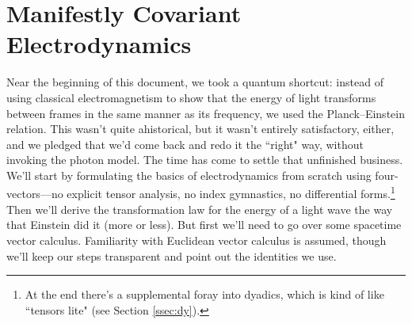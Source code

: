 \documentclass[12pt]{article}
\renewcommand{\vv}[1]{\mathbf{#1}}
\begin{document}



\clearpage

\section{Manifestly Covariant Electrodynamics}\label{sec:rem}

Near the beginning of this document, we took a quantum shortcut: instead of using classical electromagnetism to show that the energy of light transforms between frames in the same manner as its frequency, we used the Planck--Einstein relation. This wasn't quite ahistorical, but it wasn't entirely satisfactory, either, and we pledged that we'd come back and redo it the ``right" way, without invoking the photon model. The time has come to settle that unfinished business. We'll start by formulating the basics of electrodynamics from scratch using four-vectors---no explicit tensor analysis, no index gymnastics, no differential forms.\footnote{At the end there's a supplemental foray into dyadics, which is kind of like ``tensors lite" (see Section \ref{ssec:dy}).} Then we'll derive the transformation law for the energy of a light wave the way that Einstein did it (more or less). But first we'll need to go over some spacetime vector calculus. Familiarity with Euclidean vector calculus is assumed, though we'll keep our steps transparent and point out the identities we use.
\end{document}

